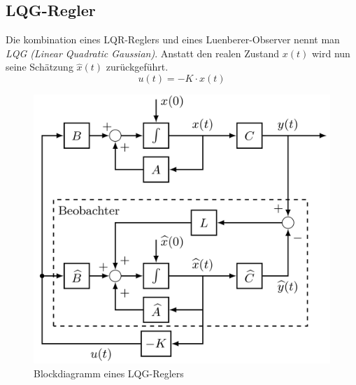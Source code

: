 \subsection{LQG-Regler}
    Die kombination eines LQR-Reglers und eines Luenberer-Observer nennt man \textit{LQG (Linear Quadratic Gaussian)}. Anstatt den realen Zustand $x(t)$ wird nun seine Schätzung $\widehat{x}(t)$ zurückgeführt.
    \begin{equation*}
        u(t) = -K\cdot\widehat{x}(t)
    \end{equation*}
    \begin{figure}[H]
        \centering
        \includegraphics[width = 0.6\linewidth]{images/10/LQG_vanilla.jpeg}
        \caption{Blockdiagramm eines LQG-Reglers}
    \end{figure}
    
    \noindent\begin{minipage}{\linewidth}
    \begin{center}
        
    \end{center}
    \end{minipage}
    
    
